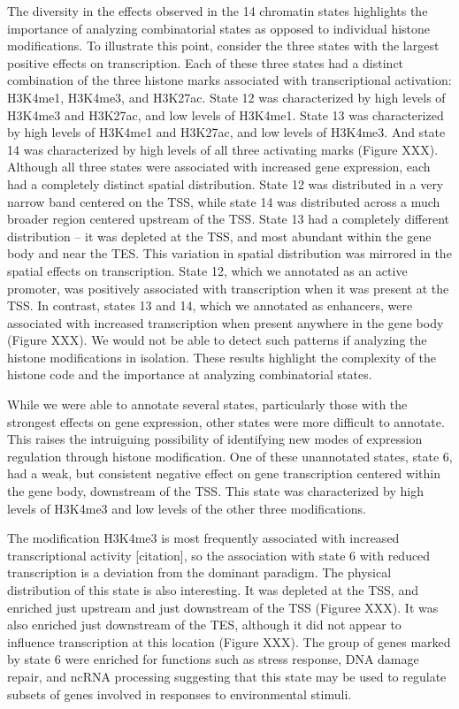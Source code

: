 \documentclass[10pt,letterpaper]{article}
\begin{document}
The diversity in the effects observed in the 14 chromatin states
highlights the importance of analyzing combinatorial states as opposed
to individual histone modifications. To illustrate this point, consider
the three states with the largest positive effects on transcription.
Each of these three states had a distinct combination of the three
histone marks associated with transcriptional activation: H3K4me1,
H3K4me3, and H3K27ac. State 12 was characterized by high levels of
H3K4me3 and H3K27ac, and low levels of H3K4me1. State 13 was
characterized by high levels of H3K4me1 and H3K27ac, and low levels of
H3K4me3. And state 14 was characterized by high levels of all three
activating marks (Figure XXX). Although all three states were associated
with increased gene expression, each had a completely distinct spatial
distribution. State 12 was distributed in a very narrow band centered on
the TSS, while state 14 was distributed across a much broader region
centered upstream of the TSS. State 13 had a completely different
distribution -- it was depleted at the TSS, and most abundant within the
gene body and near the TES. This variation in spatial distribution was
mirrored in the spatial effects on transcription. State 12, which we
annotated as an active promoter, was positively associated with
transcription when it was present at the TSS. In contrast, states 13 and
14, which we annotated as enhancers, were associated with increased
transcription when present anywhere in the gene body (Figure XXX). We
would not be able to detect such patterns if analyzing the histone
modifications in isolation. These results highlight the complexity of
the histone code and the importance at analyzing combinatorial states.

While we were able to annotate several states, particularly those with
the strongest effects on gene expression, other states were more
difficult to annotate. This raises the intruiguing possibility of
identifying new modes of expression regulation through histone
modification. One of these unannotated states, state 6, had a weak, but
consistent negative effect on gene transcription centered within the
gene body, downstream of the TSS. This state was characterized by high
levels of H3K4me3 and low levels of the other three modifications.

The modification H3K4me3 is most frequently associated with increased
transcriptional activity {[}citation{]}, so the association with state 6
with reduced transcription is a deviation from the dominant paradigm.
The physical distribution of this state is also interesting. It was
depleted at the TSS, and enriched just upstream and just downstream of
the TSS (Figuree XXX). It was also enriched just downstream of the TES,
although it did not appear to influence transcription at this location
(Figure XXX). The group of genes marked by state 6 were enriched for
functions such as stress response, DNA damage repair, and ncRNA
processing suggesting that this state may be used to regulate subsets of
genes involved in responses to environmental stimuli.
\end{document}
